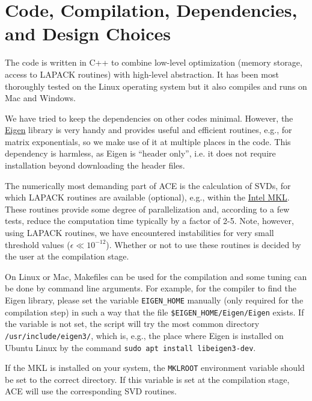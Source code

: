 \documentclass{scrartcl}
\begin{document}
\section{Code, Compilation, Dependencies, and Design Choices}
The code is written in C++ to combine low-level optimization 
(memory storage, access to LAPACK routines) with high-level abstraction.
It has been most thoroughly tested on the Linux
operating system but it also compiles and runs on Mac and Windows.

We have tried to keep the dependencies on other codes minimal.
However, the \href{http://eigen.tuxfamily.org}{Eigen} library is very handy
and provides useful and efficient routines, e.g., for matrix exponentials,
so we make use of it at multiple places in the code. This dependency is 
harmless, as Eigen is ``header only'', i.e. it does not require installation
beyond downloading the header files.

The numerically most demanding part of ACE is the calculation of SVDs, 
for which LAPACK routines are available (optional), e.g., within the
\href{https://software.intel.com/content/www/us/en/develop/tools/math-kernel-library.html}{Intel MKL}.
These routines provide 
some degree of parallelization and, according to a few tests, reduce the 
computation time typically by a factor of 2-5. Note, however, using LAPACK
routines, we have encountered instabilities for very small threshold values 
($\epsilon \ll 10^{-12}$). 
Whether or not to use these routines is decided by the user at the compilation
stage.

On Linux or Mac, Makefiles can be used for the compilation and some tuning
can be done by command line arguments. For example, for the compiler to find
the Eigen library, please set the variable 
\texttt{EIGEN\_HOME} manually (only required for the compilation step)
in such a way that the file \texttt{\$EIGEN\_HOME/Eigen/Eigen} exists.
If the variable is not set, the script will try the most common directory
\texttt{/usr/include/eigen3/}, which is, e.g., the place where Eigen is 
installed on Ubuntu Linux by the command \texttt{sudo apt install libeigen3-dev}.

If the MKL is installed on your system, the \texttt{MKLROOT} 
environment variable should be set to the correct directory.
If this variable is set at the compilation stage, 
ACE will use the corresponding SVD routines.
\end{document}
